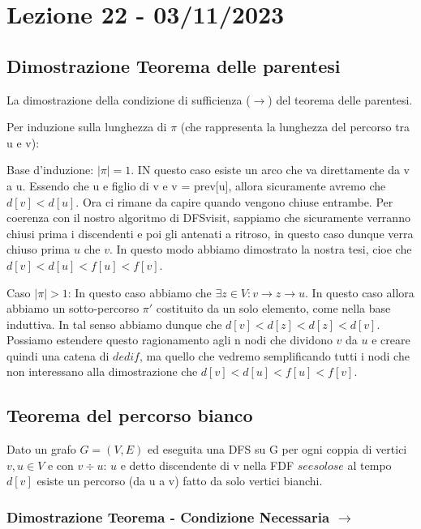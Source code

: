 \section{Lezione 22 - 03/11/2023}

\subsection{Dimostrazione Teorema delle parentesi}

La dimostrazione della condizione di sufficienza ($\rightarrow$) del teorema delle parentesi.

Per induzione sulla lunghezza di $\pi$ (che rappresenta la lunghezza del percorso tra u e v):

Base d'induzione: $|\pi| = 1$. IN questo caso esiste un arco che va direttamente da v a u. Essendo che u e figlio di v e v = prev[u], allora sicuramente avremo che $d[v] < d[u]$. Ora ci rimane da capire quando vengono chiuse entrambe. Per coerenza con il nostro algoritmo di DFSvisit, sappiamo che sicuramente verranno chiusi prima i discendenti e poi gli antenati a ritroso, in questo caso dunque verra chiuso prima $u$ che $v$.
In questo modo abbiamo dimostrato la nostra tesi, cioe che $d[v] < d[u] < f[u] < f[v]$.

Caso $|\pi| > 1$:
In questo caso abbiamo che $\exists z \in V: v\rightarrow z \rightarrow u$. In questo caso allora abbiamo un sotto-percorso $\pi\prime$ costituito da un solo elemento, come nella base induttiva. In tal senso abbiamo dunque che $d[v] < d[z] < d[z] < d[v]$.
Possiamo estendere questo ragionamento agli n nodi che dividono $v$ da $u$ e creare quindi una catena di $d e di f$, ma quello che vedremo semplificando tutti i nodi che non interessano alla dimostrazione che $d[v] < d[u] < f[u] < f[v]$.

\subsection{Teorema del percorso bianco}

Dato un grafo $G = (V,E)$ ed eseguita una DFS su G per ogni coppia di vertici $v,u \in V$ e con $v\div u$:
$u$ e detto discendente di v nella FDF $se e solo se $ al tempo $d[v]$ esiste un percorso (da u a v) fatto da solo vertici bianchi.

\subsubsection{Dimostrazione Teorema - Condizione Necessaria $\rightarrow$}

